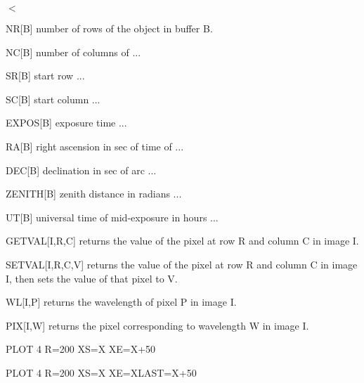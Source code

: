 {\newpage\clearpage
{}%
$<$%
\lthtmlinlinemathZ
\lthtmlcheckvsize\clearpage}

{\newpage\clearpage
{}%
\begin{example}
  \item[NR{[B]}\hfill]{number of rows of the object in buffer B.}
  \item[NC{[B]}\hfill]{number of columns of ...}
  \item[SR{[B]}\hfill]{start row ...}
  \item[SC{[B]}\hfill]{start column ...}
  \item[EXPOS{[B]}\hfill]{exposure time ...}
  \item[RA{[B]}\hfill]{right ascension in sec of time of ...}
  \item[DEC{[B]}\hfill]{declination in sec of arc ...}
  \item[ZENITH{[B]}\hfill]{zenith distance in radians ...}
  \item[UT{[B]}\hfill]{universal time of mid-exposure in hours ...}
\end{example}%
\lthtmlfigureZ
\lthtmlcheckvsize\clearpage}

{\newpage\clearpage
{}%
\begin{example}
  \item[GETVAL{[I,R,C]}\hfill]{returns the value of the pixel at row R and
       column C in image I.}
  \item[SETVAL{[I,R,C,V]}\hfill]{returns the value of the pixel at row R and
       column C in image I, then sets the value of that pixel to V.}
  \item[WL{[I,P]}\hfill]{returns the wavelength of pixel P in image I.}
  \item[PIX{[I,W]}\hfill]{returns the pixel corresponding to
       wavelength W in image I.}
\end{example}%
\lthtmlfigureZ
\lthtmlcheckvsize\clearpage}

{\newpage\clearpage
{}%
\begin{hanging}
  \item{PLOT 4 R=200 XS=X XE=X+50}
\end{hanging}%
\lthtmlfigureZ
\lthtmlcheckvsize\clearpage}

{\newpage\clearpage
{}%
\begin{hanging}
  \item{PLOT 4 R=200 XS=X XE=XLAST=X+50}
\end{hanging}%
\lthtmlfigureZ
\lthtmlcheckvsize\clearpage}

